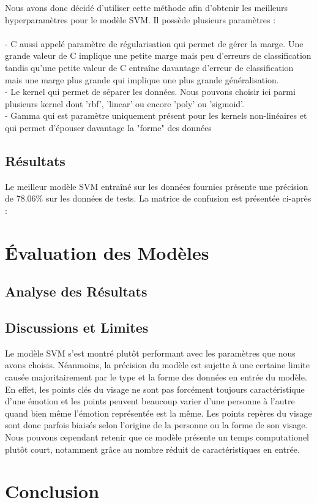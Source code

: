 \documentclass{rapport}
\begin{document}
Nous avons donc décidé d'utiliser cette méthode afin d'obtenir les meilleurs hyperparamètres pour le modèle SVM. Il possède plusieurs paramètres :\\
\\- C aussi appelé paramètre de régularisation qui permet de gérer la marge. Une grande valeur de C implique une petite marge mais peu d'erreurs de classification
tandis qu'une petite valeur de C entraîne davantage d'erreur de classification mais une marge plus grande qui implique une plus grande généralisation.\\
- Le kernel qui permet de séparer les données. Nous pouvons choisir ici parmi plusieurs kernel dont 'rbf', 'linear' ou encore
'poly' ou 'sigmoid'.\\
- Gamma qui est paramètre uniquement présent pour les kernels non-linéaires et qui permet d'épouser davantage la "forme" des données
\subsection{Résultats}

Le meilleur modèle SVM entraîné sur les données fournies présente une précision de 78.06\% sur les données de tests. La matrice de confusion est présentée ci-après :

\section{Évaluation des Modèles}
\subsection{Analyse des Résultats}

\subsection{Discussions et Limites}

Le modèle SVM s'est montré plutôt performant avec les paramètres que nous avons choisis. Néanmoins, la précision du modèle est sujette à une certaine limite causée
majoritairement par le type et la forme des données en entrée du modèle. En effet, les points clés du visage ne sont pas forcément toujours caractéristique d'une émotion
et les points peuvent beaucoup varier d'une personne à l'autre quand bien même l'émotion représentée est la même. Les points repères du visage sont donc parfois biaisés selon
l'origine de la personne ou la forme de son visage. Nous pouvons cependant retenir que ce modèle présente un temps computationel plutôt court, notamment grâce au nombre réduit
de caractéristiques en entrée.

\section{Conclusion}



\end{document}
